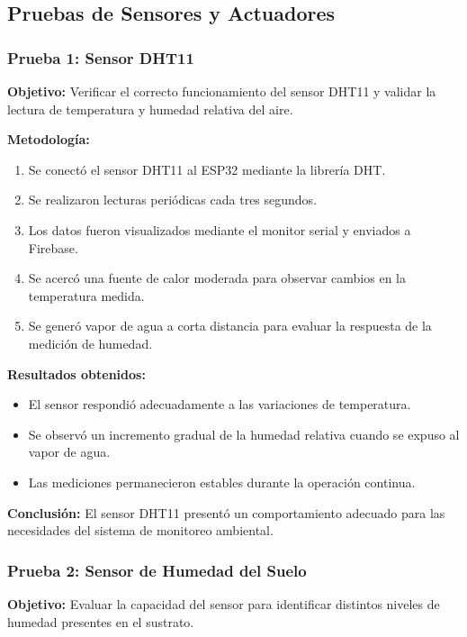 \documentclass[conference]{IEEEtran}
\begin{document}
\subsection{Pruebas de Sensores y Actuadores}

\subsubsection{Prueba 1: Sensor DHT11}

\textbf{Objetivo:}
Verificar el correcto funcionamiento del sensor DHT11 y validar la lectura de temperatura y humedad relativa del aire.

\textbf{Metodología:}
\begin{enumerate}
    \item Se conectó el sensor DHT11 al ESP32 mediante la librería DHT.
    \item Se realizaron lecturas periódicas cada tres segundos.
    \item Los datos fueron visualizados mediante el monitor serial y enviados a Firebase.
    \item Se acercó una fuente de calor moderada para observar cambios en la temperatura medida.
    \item Se generó vapor de agua a corta distancia para evaluar la respuesta de la medición de humedad.
\end{enumerate}

\textbf{Resultados obtenidos:}
\begin{itemize}
    \item El sensor respondió adecuadamente a las variaciones de temperatura.
    \item Se observó un incremento gradual de la humedad relativa cuando se expuso al vapor de agua.
    \item Las mediciones permanecieron estables durante la operación continua.
\end{itemize}

\textbf{Conclusión:}
El sensor DHT11 presentó un comportamiento adecuado para las necesidades del sistema de monitoreo ambiental.

\subsubsection{Prueba 2: Sensor de Humedad del Suelo}

\textbf{Objetivo:}
Evaluar la capacidad del sensor para identificar distintos niveles de humedad presentes en el sustrato.
\end{document}
